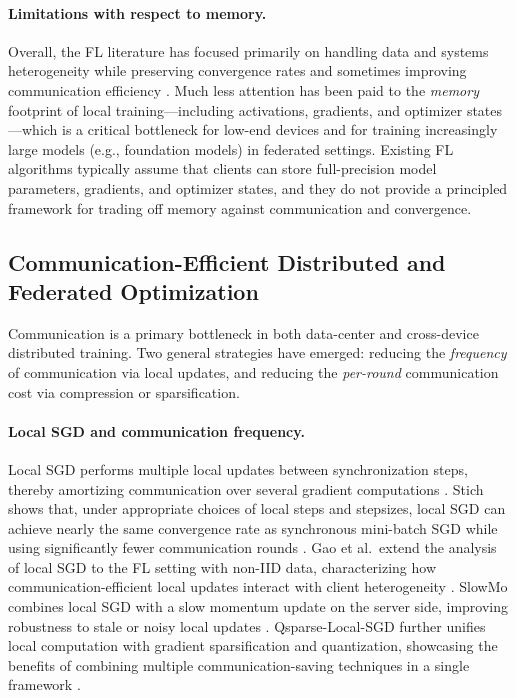 \paragraph{Limitations with respect to memory.}
Overall, the FL literature has focused primarily on handling data and systems heterogeneity while preserving convergence rates and sometimes improving communication efficiency \cite{mcmahan2017communication,li2019convergencefedavg,yang2021linear,karimireddy2020scaffold,acar2021feddyn}. Much less attention has been paid to the \emph{memory} footprint of local training---including activations, gradients, and optimizer states---which is a critical bottleneck for low-end devices and for training increasingly large models (e.g., foundation models) in federated settings. Existing FL algorithms typically assume that clients can store full-precision model parameters, gradients, and optimizer states, and they do not provide a principled framework for trading off memory against communication and convergence.

\subsection{Communication-Efficient Distributed and Federated Optimization}

Communication is a primary bottleneck in both data-center and cross-device distributed training. Two general strategies have emerged: reducing the \emph{frequency} of communication via local updates, and reducing the \emph{per-round} communication cost via compression or sparsification.

\paragraph{Local SGD and communication frequency.}
Local SGD performs multiple local updates between synchronization steps, thereby amortizing communication over several gradient computations \cite{stich2019localSGD}. Stich shows that, under appropriate choices of local steps and stepsizes, local SGD can achieve nearly the same convergence rate as synchronous mini-batch SGD while using significantly fewer communication rounds \cite{stich2019localSGD}. Gao et al.\ extend the analysis of local SGD to the FL setting with non-IID data, characterizing how communication-efficient local updates interact with client heterogeneity \cite{gao2021localSGDfed}. SlowMo combines local SGD with a slow momentum update on the server side, improving robustness to stale or noisy local updates \cite{wang2019slowmo}. Qsparse-Local-SGD further unifies local computation with gradient sparsification and quantization, showcasing the benefits of combining multiple communication-saving techniques in a single framework \cite{basu2019qsparselocal}.

